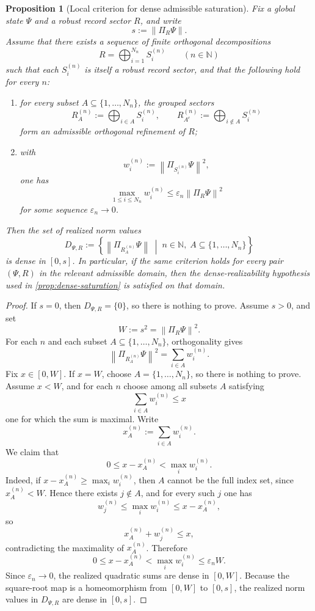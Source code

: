 \documentclass[11pt]{article}
\newtheorem{proposition}{Proposition}
\theoremstyle{remark}
\numberwithin{equation}{section}
\newcommand{\Proj}[1]{\Pi_{#1}}
\newcommand{\norm}[1]{\left\lVert #1 \right\rVert}
\begin{document}
\begin{proposition}[Local criterion for dense admissible saturation]
\label{prop:local-dense-saturation-criterion}
Fix a global state \(\Psi\) and a robust record sector \(R\), and write
\[
s := \norm{\Proj{R}\Psi}.
\]
Assume that there exists a sequence of finite orthogonal decompositions
\[
R = \bigoplus_{i=1}^{N_n} S_i^{(n)}
\qquad (n\in\mathbb{N})
\]
such that each \(S_i^{(n)}\) is itself a robust record sector, and that
the following hold for every \(n\):
\begin{enumerate}[label=(\roman*)]
\item for every subset \(A \subseteq \{1,\dots,N_n\}\), the grouped sectors
\[
R_A^{(n)} := \bigoplus_{i\in A} S_i^{(n)},
\qquad
R_{A^c}^{(n)} := \bigoplus_{i\notin A} S_i^{(n)}
\]
form an admissible orthogonal refinement of \(R\);
\item with
\[
w_i^{(n)} := \norm{\Proj{S_i^{(n)}}\Psi}^2,
\]
one has
\[
\max_{1\le i\le N_n} w_i^{(n)}
\le
\varepsilon_n \norm{\Proj{R}\Psi}^2
\]
for some sequence \(\varepsilon_n \to 0\).
\end{enumerate}
Then the set of realized norm values
\[
D_{\Psi,R}
:=
\left\{
\norm{\Proj{R_A^{(n)}}\Psi}
\;\middle|\;
n\in\mathbb{N},\;
A\subseteq\{1,\dots,N_n\}
\right\}
\]
is dense in \([0,s]\). In particular, if the same criterion holds for
every pair \((\Psi,R)\) in the relevant admissible domain, then the
dense-realizability hypothesis used in \cref{prop:dense-saturation} is
satisfied on that domain.
\end{proposition}

\begin{proof}
If \(s=0\), then \(D_{\Psi,R}=\{0\}\), so there is nothing to prove.
Assume \(s>0\), and set
\[
W := s^2 = \norm{\Proj{R}\Psi}^2.
\]
For each \(n\) and each subset \(A \subseteq \{1,\dots,N_n\}\),
orthogonality gives
\[
\norm{\Proj{R_A^{(n)}}\Psi}^2
=
\sum_{i\in A} w_i^{(n)}.
\]
Fix \(x\in[0,W]\). If \(x=W\), choose \(A=\{1,\dots,N_n\}\), so there
is nothing to prove. Assume \(x<W\), and for each \(n\) choose among
all subsets \(A\) satisfying
\[
\sum_{i\in A} w_i^{(n)} \le x
\]
one for which the sum is maximal. Write
\[
x_A^{(n)} := \sum_{i\in A} w_i^{(n)}.
\]
We claim that
\[
0 \le x - x_A^{(n)} < \max_i w_i^{(n)}.
\]
Indeed, if \(x - x_A^{(n)} \ge \max_i w_i^{(n)}\), then \(A\) cannot be
the full index set, since \(x_A^{(n)}<W\). Hence there exists
\(j\notin A\), and for every such \(j\) one has
\[
w_j^{(n)} \le \max_i w_i^{(n)} \le x - x_A^{(n)},
\]
so
\[
x_A^{(n)} + w_j^{(n)} \le x,
\]
contradicting the maximality of \(x_A^{(n)}\). Therefore
\[
0 \le x - x_A^{(n)} < \max_i w_i^{(n)}
\le
\varepsilon_n W.
\]
Since \(\varepsilon_n \to 0\), the realized quadratic sums are dense in
\([0,W]\). Because the square-root map is a homeomorphism from
\([0,W]\) to \([0,s]\), the realized norm values in \(D_{\Psi,R}\) are
dense in \([0,s]\).
\end{proof}
\end{document}

